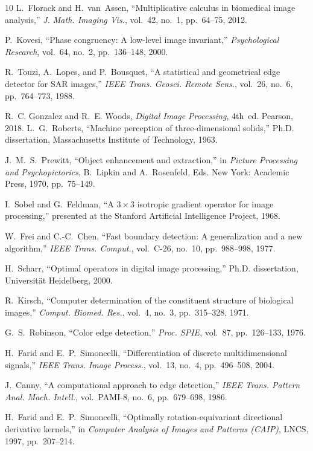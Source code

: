 \documentclass[conference]{IEEEtran}
\begin{document}
\begin{thebibliography}{10}
L.~Florack and H.~van~Assen, ``Multiplicative calculus in biomedical image
analysis,'' \emph{J. Math. Imaging Vis.}, vol.~42, no.~1, pp.~64--75, 2012.

P.~Kovesi, ``Phase congruency: A low-level image invariant,''
\emph{Psychological Research}, vol.~64, no.~2, pp.~136--148, 2000.

R.~Touzi, A.~Lopes, and P.~Bousquet, ``A statistical and geometrical edge
detector for SAR images,'' \emph{IEEE Trans. Geosci. Remote Sens.}, vol.~26,
no.~6, pp.~764--773, 1988.

R.~C. Gonzalez and R.~E. Woods, \emph{Digital Image Processing}, 4th~ed. Pearson, 2018.
L.~G.~Roberts, ``Machine perception of three-dimensional solids,''
Ph.D. dissertation, Massachusetts Institute of Technology, 1963.

J.~M.~S.~Prewitt, ``Object enhancement and extraction,'' in \emph{Picture
Processing and Psychopictorics}, B.~Lipkin and A.~Rosenfeld, Eds.  New York:
Academic Press, 1970, pp.~75--149.

I.~Sobel and G.~Feldman, ``A $3\times3$ isotropic gradient operator for image
processing,'' presented at the Stanford Artificial Intelligence Project, 1968.

W.~Frei and C.-C.~Chen, ``Fast boundary detection: A generalization and a new
algorithm,'' \emph{IEEE Trans. Comput.}, vol.~C-26, no.~10, pp.~988--998, 1977.

H.~Scharr, ``Optimal operators in digital image processing,''
Ph.D. dissertation, Universit{\"a}t Heidelberg, 2000.

R.~Kirsch, ``Computer determination of the constituent structure of
biological images,'' \emph{Comput. Biomed. Res.}, vol.~4, no.~3, pp.~315--328,
1971.

G.~S.~Robinson, ``Color edge detection,''
\emph{Proc. SPIE}, vol.~87, pp.~126--133, 1976.

H.~Farid and E.~P.~Simoncelli, ``Differentiation of discrete
multidimensional signals,''
\emph{IEEE Trans. Image Process.}, vol.~13, no.~4, pp.~496--508, 2004.

J.~Canny, ``A computational approach to edge detection,''
\emph{IEEE Trans. Pattern Anal. Mach. Intell.}, vol.~PAMI-8, no.~6, pp.~679--698, 1986.

H.~Farid and E.~P.~Simoncelli, ``Optimally rotation-equivariant directional
derivative kernels,'' in \emph{Computer Analysis of Images and Patterns (CAIP)},
LNCS, 1997, pp.~207--214.


\end{thebibliography}
\end{document}
